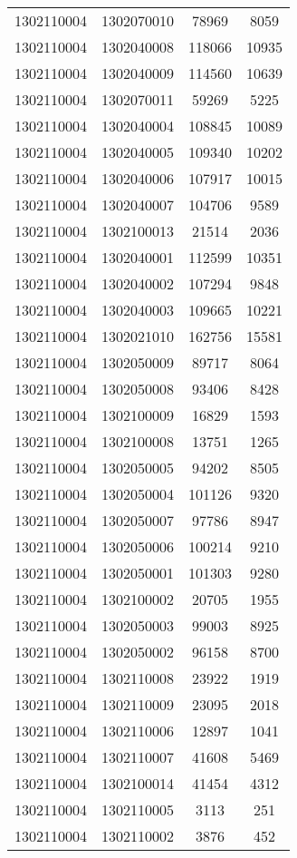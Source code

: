 \begin{longtable}{llcc}
1302110004 & 1302070010 & 78969 & 8059\\
1302110004 & 1302040008 & 118066 & 10935\\
1302110004 & 1302040009 & 114560 & 10639\\
1302110004 & 1302070011 & 59269 & 5225\\
1302110004 & 1302040004 & 108845 & 10089\\
1302110004 & 1302040005 & 109340 & 10202\\
1302110004 & 1302040006 & 107917 & 10015\\
1302110004 & 1302040007 & 104706 & 9589\\
1302110004 & 1302100013 & 21514 & 2036\\
1302110004 & 1302040001 & 112599 & 10351\\
1302110004 & 1302040002 & 107294 & 9848\\
1302110004 & 1302040003 & 109665 & 10221\\
1302110004 & 1302021010 & 162756 & 15581\\
1302110004 & 1302050009 & 89717 & 8064\\
1302110004 & 1302050008 & 93406 & 8428\\
1302110004 & 1302100009 & 16829 & 1593\\
1302110004 & 1302100008 & 13751 & 1265\\
1302110004 & 1302050005 & 94202 & 8505\\
1302110004 & 1302050004 & 101126 & 9320\\
1302110004 & 1302050007 & 97786 & 8947\\
1302110004 & 1302050006 & 100214 & 9210\\
1302110004 & 1302050001 & 101303 & 9280\\
1302110004 & 1302100002 & 20705 & 1955\\
1302110004 & 1302050003 & 99003 & 8925\\
1302110004 & 1302050002 & 96158 & 8700\\
1302110004 & 1302110008 & 23922 & 1919\\
1302110004 & 1302110009 & 23095 & 2018\\
1302110004 & 1302110006 & 12897 & 1041\\
1302110004 & 1302110007 & 41608 & 5469\\
1302110004 & 1302100014 & 41454 & 4312\\
1302110004 & 1302110005 & 3113 & 251\\
1302110004 & 1302110002 & 3876 & 452\\

\end{longtable}
